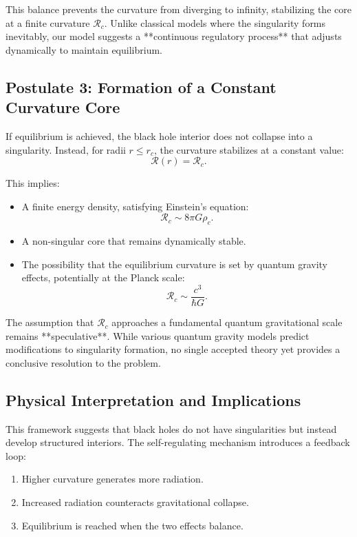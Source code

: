 This balance prevents the curvature from diverging to infinity, stabilizing the core at a finite curvature \( \mathcal{R}_c \). Unlike classical models where the singularity forms inevitably, our model suggests a **continuous regulatory process** that adjusts dynamically to maintain equilibrium.

\subsection{Postulate 3: Formation of a Constant Curvature Core}

If equilibrium is achieved, the black hole interior does not collapse into a singularity. Instead, for radii \( r \leq r_c \), the curvature stabilizes at a constant value:
\begin{equation}
    \mathcal{R}(r) = \mathcal{R}_c.
\end{equation}

This implies:
\begin{itemize}
    \item A finite energy density, satisfying Einstein’s equation:
    \begin{equation}
        \mathcal{R}_c \sim 8\pi G \rho_c.
    \end{equation}
    \item A non-singular core that remains dynamically stable.
    \item The possibility that the equilibrium curvature is set by quantum gravity effects, potentially at the Planck scale:
    \begin{equation}
        \mathcal{R}_c \sim \frac{c^3}{\hbar G}.
    \end{equation}
\end{itemize}

The assumption that \( \mathcal{R}_c \) approaches a fundamental quantum gravitational scale remains **speculative**. While various quantum gravity models predict modifications to singularity formation, no single accepted theory yet provides a conclusive resolution to the problem.

\subsection{Physical Interpretation and Implications}

This framework suggests that black holes do not have singularities but instead develop structured interiors. The self-regulating mechanism introduces a feedback loop:
\begin{enumerate}
    \item Higher curvature generates more radiation.
    \item Increased radiation counteracts gravitational collapse.
    \item Equilibrium is reached when the two effects balance.
\end{enumerate}

